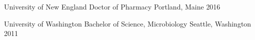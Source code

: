 

\begin{cventries}

  \cventry
    {University of New England} %
    {Doctor of Pharmacy} %
    {Portland, Maine} %
    {2016} %
    {
    }

  \cventry
    {University of Washington}
    {Bachelor of Science, Microbiology}
    {Seattle, Washington}
    {2011}
    {
    }

\end{cventries}
